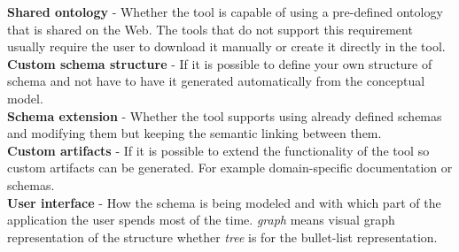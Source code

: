 {\begin{landscape}
\begin{table}
{  \textbf{Shared ontology} - Whether the tool is capable of using a pre-defined ontology that is shared on the Web. The tools that do not support this requirement usually require the user to download it manually or create it directly in the tool.\\
  \textbf{Custom schema structure} - If it is possible to define your own structure of schema and not have to have it generated automatically from the conceptual model.\\
  \textbf{Schema extension} - Whether the tool supports using already defined schemas and modifying them but keeping the semantic linking between them.\\
  \textbf{Custom artifacts} - If it is possible to extend the functionality of the tool so custom artifacts can be generated. For example domain-specific documentation or schemas.\\
  \textbf{User interface} - How the schema is being modeled and with which part of the application the user spends most of the time. \textit{graph} means visual graph representation of the structure whether \textit{tree} is for the bullet-list representation.
  }
  \end{table}
\end{landscape}}